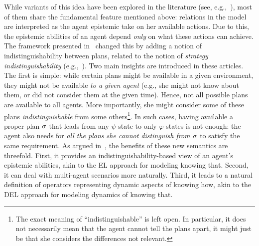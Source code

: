 While variants of this idea have been explored in the literature (see, e.g.,~\cite{Li17,LiWang17,FervariHLW17,Wang19a}),
most of them share the fundamental feature mentioned above: relations in the model are interpreted as the agent epistemic take on her available actions. Due to this, the epistemic abilities of an agent depend \emph{only} on what these actions can achieve. The framework presented in~\cite{AFSVQ21,AFSVQ23report} changed this by adding a notion of indistinguishability between plans, related to the notion of \emph{strategy indistinguishability} (e.g.,~\cite{JamrogaH04,Belardinelli14}). Two main insights are introduced in these articles. The first is simple: while certain plans might be available in a given environment, they might not be available \emph{to a given agent} (e.g., she might not know about them, or did not consider them at the given time). Hence, not all possible plans are available to all agents.  More importantly, she might consider some of these plans \emph{indistinguishable} from some others\footnote{The exact meaning of ``indistinguishable'' is left open. In particular, it does not necessarily mean that the agent cannot tell the plans apart, it might just be that she considers the differences not relevant.}. In such cases, having available a proper plan $\sigma$ that leads from any $\psi$-state to only $\varphi$-states is not enough: the agent also needs for \emph{all the plans she cannot distinguish from $\sigma$} to satisfy the same requirement. As argued in~\cite{AFSVQ21}, the benefits of these new semantics are threefold. First, it provides an indistinguishability-based view of an agent's epistemic abilities, akin to the EL approach for modeling knowing that. Second, it can deal with multi-agent scenarios more naturally. Third, it leads to a natural definition of operators representing dynamic aspects of knowing how, akin to the DEL approach for modeling dynamics of knowing that.
%
